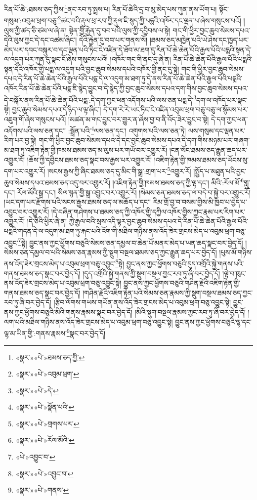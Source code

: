རིན་པོ་ཆེ་:ཐམས་ཅད་ཀྱིས་\footnote{«སྣར་»«པེ་»ཐམས་ཅད་ཀྱི་}ནང་རབ་ཏུ་སྤྲས་པ། རིན་པོ་ཆེའི་དྲ་བ་མུ་མེད་པས་ཀུན་ནས་ཡོག་པ། སྟོང་གསུམ་:འབུམ་ཕྲག་བཅུ་\footnote{«སྣར་»«པེ་»འབུམ་ཕྲག་}ཚང་བའི་རྡུལ་ཕྲ་རབ་ཀྱི་རྡུལ་ཇི་སྙད་ཀྱི་པདྨའི་འཁོར་དང་ལྡན་པ་ཞེས་གསུངས་པའོ། །
ལུས་ཀྱི་ཚད་ཅི་ཙམ་ལ་ཞེ་ན། སྟེན་གྱི་རྐྱེན་དུ་བབ་པའི་ལུས་ཀྱི་དབྱིབས་ལ་སྟེ། གང་གི་ཕྱིར་བྱང་ཆུབ་སེམས་དཔའ་དེའི་ལུས་ཀྱང་དེ་དང་འཚམ་ཞིང་། དེའི་རྐྱེན་དུ་བབ་པར་གནས་སོ། །ཐམས་ཅད་མཁྱེན་པའི་ཡེ་ཤེས་དང་ཁྱད་པར་མེད་པར་དབང་བསྐུར་བ་དང་ལྡན་པའི་ཏིང་ངེ་འཛིན་དེ་ཐོབ་མ་ཐག་དུ་རིན་པོ་ཆེ་ཆེན་པོའི་རྒྱལ་པོའི་པདྨའི་སྟན་དེ་ལ་འདུག་པར་ཀུན་དུ་སྣང་ངོ་ཞེས་གསུངས་པའོ། །འཁོར་གང་གི་ནང་དུ་ཞེ་ན། རིན་པོ་ཆེ་ཆེན་པོའི་རྒྱལ་པོའི་པདྨའི་སྟན་དེའི་འཁོར་གྱི་པདྨ་ལ་འདུག་པའི་བྱང་ཆུབ་སེམས་དཔའི་འཁོར་གྱི་ནང་དུ་སྟེ། གང་གི་ཕྱིར་བྱང་ཆུབ་སེམས་དཔའ་དེ་རིན་པོ་ཆེ་ཆེན་པོའི་རྒྱལ་པོའི་པདྨ་དེ་ལ་འདུག་མ་ཐག་ཏུ་དེ་ནས་རིན་པོ་ཆེ་ཆེན་པོའི་རྒྱལ་པོའི་པདྨའི་འཁོར་རིན་པོ་ཆེ་ཆེན་པོའི་པདྨ་ཇི་སྙེད་བྱུང་བ་དེ་སྙེད་ཀྱི་བྱང་ཆུབ་སེམས་དཔའ་དག་གིས་བྱང་ཆུབ་སེམས་དཔའ་དེ་བསྐོར་ནས་རིན་པོ་ཆེ་ཆེན་པོའི་པདྨ་:དེ་དག་ཀྱང་ཕན་འདོགས་པའི་ལས་ཅན་པདྨ་དེ་\footnote{«སྣར་»«པེ་»དེ་}དག་ལ་འཁོད་པར་སྣང་སྟེ། བྱང་ཆུབ་སེམས་དཔའ་དེ་ཉིད་ལ་ལྟ་ཞིང་། དེ་དག་རེ་རེ་ཡང་ཏིང་ངེ་འཛིན་འབུམ་ཕྲག་བཅུ་བཅུ་ལ་སྙོམས་པར་འཇུག་གོ་ཞེས་གསུངས་པའོ། །མཚན་མ་གང་བྱུང་བར་གྱུར་ན་ཞེས་བྱ་བ་ནི་འོད་ཟེར་བྱུང་བ་སྟེ། དེ་དག་ཀྱང་ཕན་འདོགས་པའི་ལས་ཅན་དང་། :སྦྲོན་པའི་\footnote{«སྣར་»«པེ་»སྣོན་པའི་}ལས་ཅན་དང་། འགུགས་པའི་ལས་ཅན་ཏེ། ལས་གསུམ་དང་ལྡན་པར་རིག་པར་བྱ་སྟེ། གང་གི་ཕྱིར་བྱང་ཆུབ་སེམས་དཔའ་དེ་དང་བྱང་ཆུབ་སེམས་དཔའ་དེ་དག་གིས་མཉམ་པར་གཞག་མ་ཐག་ཏུ་འཇིག་རྟེན་གྱི་ཁམས་ཐམས་ཅད་མ་ལུས་པར་གཡོ་བར་འགྱུར་རོ། །ངན་སོང་ཐམས་ཅད་རྒྱུན་ཆད་པར་འགྱུར་རོ། །ཆོས་ཀྱི་དབྱིངས་ཐམས་ཅད་སྣང་བས་རྒྱས་པར་འགྱུར་རོ། །འཇིག་རྟེན་གྱི་ཁམས་ཐམས་ཅད་ཡོངས་སུ་དག་པར་འགྱུར་རོ། །སངས་རྒྱས་ཀྱི་ཞིང་ཐམས་ཅད་དུ་མིང་གི་སྒྲ་:གྲག་པར་\footnote{«སྣར་»«པེ་»གྲགས་པར་}འགྱུར་རོ། །སྤྱོད་པ་མཐུན་པའི་བྱང་ཆུབ་སེམས་དཔའ་ཐམས་ཅད་འདུ་བར་འགྱུར་རོ། །འཇིག་རྟེན་གྱི་ཁམས་ཐམས་ཅད་ཀྱི་ལྷ་དང་། མིའི་:རོལ་མོ་\footnote{«སྣར་»«པེ་»རོལ་མོའི་}གླུ་དང་། རོལ་མོའི་སྒྲ་དང་། སིལ་སྙན་གྱི་སྒྲ་འབྱུང་བར་འགྱུར་རོ། །སེམས་ཅན་ཐམས་ཅད་ལ་བདེ་བ་སྐྱེ་བར་འགྱུར་རོ། །ཡང་དག་པར་རྫོགས་པའི་སངས་རྒྱས་ཐམས་ཅད་ལ་མཆོད་པ་དང་། རིམ་གྲོ་བྱ་བ་བསམ་གྱིས་མི་ཁྱབ་པ་བྱེད་པ་འབྱུང་བར་འགྱུར་རོ། །དེ་བཞིན་གཤེགས་པ་ཐམས་ཅད་ཀྱི་འཁོར་གྱི་དཀྱིལ་འཁོར་གྱིས་ཀྱང་རྣམ་པར་རིག་པར་འགྱུར་རོ། །དེ་ཅིའི་ཕྱིར་ཞེ་ན། ཀྱེ་རྒྱལ་བའི་སྲས་འདི་ལྟར་བྱང་ཆུབ་སེམས་དཔའ་དེ་རིན་པོ་ཆེ་ཆེན་པོའི་རྒྱལ་པོའི་པདྨའི་གདན་དེ་ལ་འདུག་མ་ཐག་ཏུ་རྐང་པའི་འོག་གི་མཐིལ་གཉིས་ནས་འོད་ཟེར་གྲངས་མེད་པ་འབུམ་ཕྲག་བཅུ་འབྱུང་\footnote{«པེ་»འབྱུང་བ་}སྟེ། བྱུང་ནས་ཀྱང་ཕྱོགས་བཅུའི་སེམས་ཅན་དམྱལ་བ་ཆེན་པོ་མནར་མེད་པ་ཡན་ཆད་སྣང་བར་བྱེད་དོ། །སེམས་ཅན་དམྱལ་བ་པའི་སེམས་ཅན་རྣམས་ཀྱི་སྡུག་བསྔལ་ཐམས་ཅད་ཀྱང་རྒྱུན་ཆད་པར་བྱེད་དོ། །པུས་མོ་གཉིས་ནས་འོད་ཟེར་གྲངས་མེད་པ་འབུམ་ཕྲག་བཅུ་འབྱུང་\footnote{«སྣར་»«པེ་»འབྱུང་བ་}སྟེ། བྱུང་ནས་ཀྱང་ཕྱོགས་བཅུའི་དུད་འགྲོའི་སྐྱེ་གནས་པའི་གནས་ཐམས་ཅད་སྣང་བར་བྱེད་དོ། །དུད་འགྲོའི་སྐྱེ་གནས་ཀྱི་སྡུག་བསྔལ་ཀྱང་རབ་ཏུ་ཞི་བར་བྱེད་དོ། །ལྟེ་བ་ཁུང་ནས་འོད་ཟེར་གྲངས་མེད་པ་འབུམ་ཕྲག་བཅུ་འབྱུང་སྟེ། བྱུང་ནས་ཀྱང་ཕྱོགས་བཅུའི་གཤིན་རྗེའི་འཇིག་རྟེན་གྱི་གནས་ཐམས་ཅད་སྣང་བར་བྱེད་དོ། །གཤིན་རྗེའི་འཇིག་རྟེན་པའི་སེམས་ཅན་རྣམས་ཀྱི་སྡུག་བསྔལ་ཐམས་ཅད་ཀྱང་རབ་ཏུ་ཞི་བར་བྱེད་དོ། །རྩིབ་ལོགས་གཡས་གཡོན་ནས་འོད་ཟེར་གྲངས་མེད་པ་འབུམ་ཕྲག་བཅུ་འབྱུང་སྟེ། བྱུང་ནས་ཀྱང་ཕྱོགས་བཅུའི་མིའི་གནས་རྣམས་སྣང་བར་བྱེད་དོ། །མིའི་སྡུག་བསྔལ་རྣམས་ཀྱང་རབ་ཏུ་ཞི་བར་བྱེད་དོ། །ལག་པའི་མཐིལ་གཉིས་ནས་འོད་ཟེར་གྲངས་མེད་པ་འབུམ་ཕྲག་བཅུ་འབྱུང་སྟེ། བྱུང་ནས་ཀྱང་ཕྱོགས་བཅུའི་ལྷ་དང་ལྷ་མ་ཡིན་གྱི་:གནས་རྣམས་\footnote{«སྣར་»«པེ་»གནས་}སྣང་བར་བྱེད་དོ། 